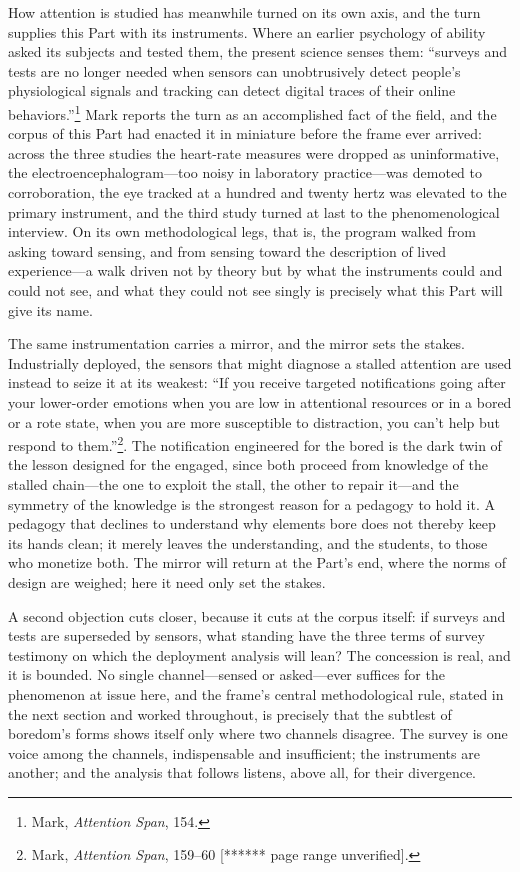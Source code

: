 \documentclass{article}
\begin{document}
How attention is studied has meanwhile turned on its own axis, and the turn supplies this Part with its instruments. Where an earlier psychology of ability asked its subjects and tested them, the present science senses them: ``surveys and tests are no longer needed when sensors can unobtrusively detect people's physiological signals and tracking can detect digital traces of their online behaviors.''\footnote{Mark, \textit{Attention Span}, 154.} Mark reports the turn as an accomplished fact of the field, and the corpus of this Part had enacted it in miniature before the frame ever arrived: across the three studies the heart-rate measures were dropped as uninformative, the electroencephalogram---too noisy in laboratory practice---was demoted to corroboration, the eye tracked at a hundred and twenty hertz was elevated to the primary instrument, and the third study turned at last to the phenomenological interview. On its own methodological legs, that is, the program walked from asking toward sensing, and from sensing toward the description of lived experience---a walk driven not by theory but by what the instruments could and could not see, and what they could not see singly is precisely what this Part will give its name.

The same instrumentation carries a mirror, and the mirror sets the stakes. Industrially deployed, the sensors that might diagnose a stalled attention are used instead to seize it at its weakest: ``If you receive targeted notifications going after your lower-order emotions when you are low in attentional resources or in a bored or a rote state, when you are more susceptible to distraction, you can't help but respond to them.''\footnote{Mark, \textit{Attention Span}, 159--60 [****** page range unverified].}. The notification engineered for the bored is the dark twin of the lesson designed for the engaged, since both proceed from knowledge of the stalled chain---the one to exploit the stall, the other to repair it---and the symmetry of the knowledge is the strongest reason for a pedagogy to hold it. A pedagogy that declines to understand why elements bore does not thereby keep its hands clean; it merely leaves the understanding, and the students, to those who monetize both. The mirror will return at the Part's end, where the norms of design are weighed; here it need only set the stakes.

A second objection cuts closer, because it cuts at the corpus itself: if surveys and tests are superseded by sensors, what standing have the three terms of survey testimony on which the deployment analysis will lean? The concession is real, and it is bounded. No single channel---sensed or asked---ever suffices for the phenomenon at issue here, and the frame's central methodological rule, stated in the next section and worked throughout, is precisely that the subtlest of boredom's forms shows itself only where two channels disagree. The survey is one voice among the channels, indispensable and insufficient; the instruments are another; and the analysis that follows listens, above all, for their divergence.
\end{document}
